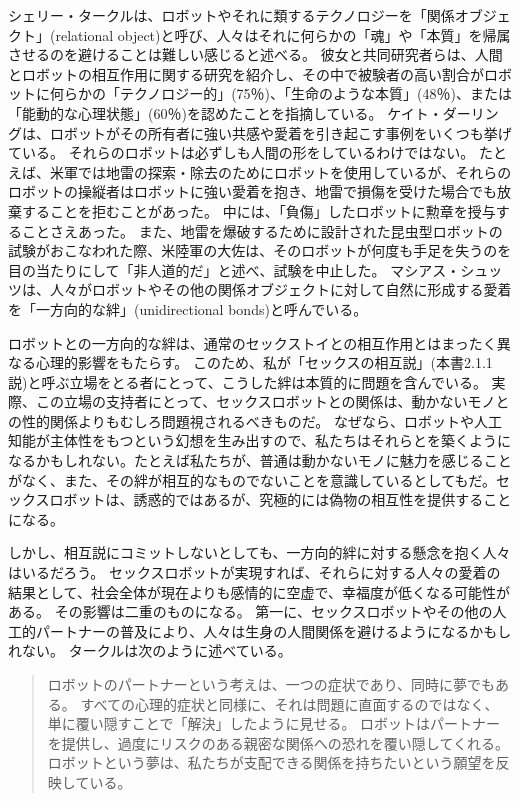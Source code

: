 \documentclass[paper=a4,book,openany]{jlreq} \usepackage{mystyle}
\begin{document}
シェリー・タークルは、ロボットやそれに類するテクノロジーを「関係オブジェクト」(relational object)と呼び、人々はそれに何らかの「魂」や「本質」を帰属させるのを避けることは難しい感じると述べる。
彼女と共同研究者らは、人間とロボットの相互作用に関する研究を紹介し、その中で被験者の高い割合がロボットに何らかの「テクノロジー的」(75％)、「生命のような本質」(48％)、または「能動的な心理状態」(60％)を認めたことを指摘している\citep[p.349]{turkle18:_relat_artif_child_elder}。
ケイト・ダーリングは、ロボットがその所有者に強い共感や愛着を引き起こす事例をいくつも挙げている。
それらのロボットは必ずしも人間の形をしているわけではない。
たとえば、米軍では地雷の探索・除去のためにロボットを使用しているが、それらのロボットの操縦者はロボットに強い愛着を抱き、地雷で損傷を受けた場合でも放棄することを拒むことがあった。
中には、「負傷」したロボットに勲章を授与することさえあった。
また、地雷を爆破するために設計された昆虫型ロボットの試験がおこなわれた際、米陸軍の大佐は、そのロボットが何度も手足を失うのを目の当たりにして「非人道的だ」と述べ、試験を中止した\citep{darling16:_exten_legal_protec_social_robot}。
マシアス・シュッツは、人々がロボットやその他の関係オブジェクトに対して自然に形成する愛着を「一方向的な絆」(unidirectional bonds)と呼んでいる\citep{scheutz12:_inher_danger_unidir_emotion_bonds}。

ロボットとの一方向的な絆は、通常のセックストイとの相互作用とはまったく異なる心理的影響をもたらす。
このため、私が「セックスの相互説」(本書2.1.1説)と呼ぶ立場をとる者にとって、こうした絆は本質的に問題を含んでいる。
実際、この立場の支持者にとって、セックスロボットとの関係は、動かないモノとの性的関係よりもむしろ問題視されるべきものだ。
なぜなら、ロボットや人工知能が主体性をもつという幻想を生み出すので、私たちはそれらとを築くようになるかもしれない。たとえば私たちが、普通は動かないモノに魅力を感じることがなく、また、その絆が相互的なものでないことを意識しているとしてもだ。セックスロボットは、誘惑的ではあるが、究極的には偽物の相互性を提供することになる。

しかし、相互説にコミットしないとしても、一方向的絆に対する懸念を抱く人々はいるだろう。
セックスロボットが実現すれば、それらに対する人々の愛着の結果として、社会全体が現在よりも感情的に空虚で、幸福度が低くなる可能性がある。
その影響は二重のものになる。
第一に、セックスロボットやその他の人工的パートナーの普及により、人々は生身の人間関係を避けるようになるかもしれない。
タークルは次のように述べている。

\begin{quote}
ロボットのパートナーという考えは、一つの症状であり、同時に夢でもある。
すべての心理的症状と同様に、それは問題に直面するのではなく、単に覆い隠すことで「解決」したように見せる。
ロボットはパートナーを提供し、過度にリスクのある親密な関係への恐れを覆い隠してくれる。
ロボットという夢は、私たちが支配できる関係を持ちたいという願望を反映している。
\citep[p.285]{turkle11:_alone_toget}
\end{quote}
\end{document}

